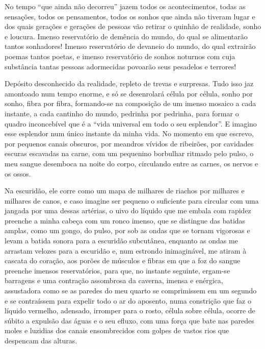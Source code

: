 
No tempo ``que ainda não decorreu'' jazem todos os acontecimentos, todas
as sensações, todos os pensamentos, todos os sonhos que ainda não
tiveram lugar e dos quais gerações e gerações de pessoas vão retirar o
quinhão de realidade, sonho e loucura. Imenso reservatório de demência
do mundo, do qual se alimentarão tantos sonhadores! Imenso reservatório
de devaneio do mundo, do qual extrairão poemas tantos poetas, e imenso
reservatório de sonhos noturnos com cuja substância tantas pessoas
adormecidas povoarão seus pesadelos e terrores!

Depósito desconhecido da realidade, repleto de trevas e surpresas. Tudo
isso jaz amontoado num tempo enorme, e só se desenrolará célula por
célula, sonho por sonho, fibra por fibra, formando-se na composição de
um imenso mosaico a cada instante, a cada cantinho do mundo, pedrinha
por pedrinha, para formar o quadro inconcebível que é a ``vida universal
em todo o seu esplendor''. E imagino esse esplendor num único instante
da minha vida. No momento em que escrevo, por pequenos canais obscuros,
por meandros vívidos de ribeirões, por cavidades escuras escavadas na
carne, com um pequenino borbulhar ritmado pelo pulso, o meu sangue
desemboca na noite do corpo, circulando entre as carnes, os nervos e os
ossos.

Na escuridão, ele corre como um mapa de milhares de riachos por milhares
e milhares de canos, e caso imagine ser pequeno o suficiente para
circular com uma jangada por uma dessas artérias, o uivo do líquido que
me embala com rapidez preenche a minha cabeça com um ronco imenso, que
se distingue das batidas amplas, como um gongo, do pulso, por sob as
ondas que se tornam vigorosas e levam a batida sonora para a escuridão
subcutânea, enquanto as ondas me arrastam velozes para a escuridão e,
num estrondo inimaginável, me atiram à cascata do coração, aos porões de
músculos e fibras em que a foz do sangue preenche imensos reservatórios,
para que, no instante seguinte, ergam-se barragens e uma contração
assombrosa da caverna, imensa e enérgica, assustadora como se as paredes
do meu quarto se comprimissem em um segundo e se contraíssem para
expelir todo o ar do aposento, numa constrição que faz o líquido
vermelho, adensado, irromper para o rosto, célula sobre célula, ocorre
de súbito a expulsão das águas e o seu efluxo, com uma força que bate
nas paredes moles e luzidias dos canais ensombrecidos com golpes de
vastos rios que despencam das alturas.

